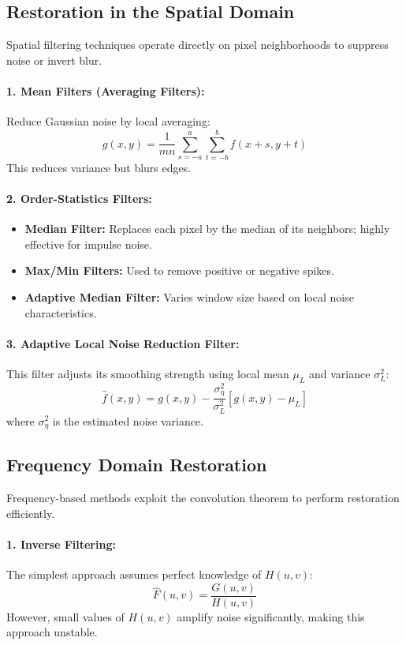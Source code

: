 \documentclass[12pt,a4paper]{AnantDocumentation}
\begin{document}
\subsection{Restoration in the Spatial Domain}
Spatial filtering techniques operate directly on pixel neighborhoods to suppress noise or invert blur.

\paragraph{1. Mean Filters (Averaging Filters):}
Reduce Gaussian noise by local averaging:
\begin{equation}
g(x,y) = \frac{1}{mn} \sum_{s=-a}^{a} \sum_{t=-b}^{b} f(x+s, y+t)
\end{equation}
This reduces variance but blurs edges.

\paragraph{2. Order-Statistics Filters:}
\begin{itemize}
\item \textbf{Median Filter:} Replaces each pixel by the median of its neighbors; highly effective for impulse noise.
\item \textbf{Max/Min Filters:} Used to remove positive or negative spikes.
\item \textbf{Adaptive Median Filter:} Varies window size based on local noise characteristics.
\end{itemize}

\paragraph{3. Adaptive Local Noise Reduction Filter:}
This filter adjusts its smoothing strength using local mean $\mu_L$ and variance $\sigma_L^2$:
\begin{equation}
\hat{f}(x,y) = g(x,y) - \frac{\sigma_\eta^2}{\sigma_L^2} [g(x,y) - \mu_L]
\end{equation}
where $\sigma_\eta^2$ is the estimated noise variance.

\subsection{Frequency Domain Restoration}
Frequency-based methods exploit the convolution theorem to perform restoration efficiently.

\paragraph{1. Inverse Filtering:}
The simplest approach assumes perfect knowledge of $H(u,v)$:
\begin{equation}
\hat{F}(u,v) = \frac{G(u,v)}{H(u,v)}
\end{equation}
However, small values of $H(u,v)$ amplify noise significantly, making this approach unstable.
\end{document}
